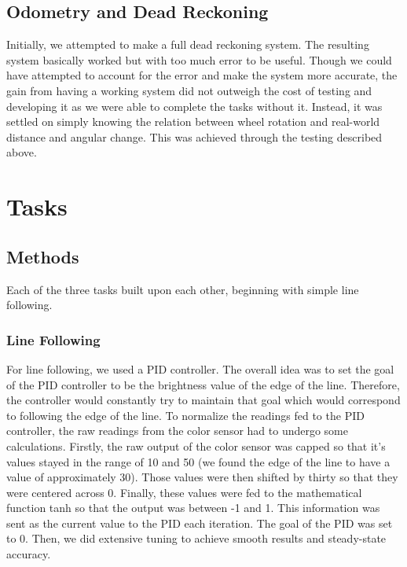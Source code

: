 \documentclass[12pt]{article}
\begin{document}
\subsection{Odometry and Dead Reckoning}

Initially, we attempted to make a full dead reckoning system. The resulting system basically worked but with too much error to be useful. Though we could have attempted to account for the error and make the system more accurate, the gain from having a working system did not outweigh the cost of testing and developing it as we were able to complete the tasks without it. Instead, it was settled on simply knowing the relation between wheel rotation and real-world distance and angular change. This was achieved through the testing described above. 

\section{Tasks}

\subsection{Methods}

Each of the three tasks built upon each other, beginning with simple line following.

\subsubsection{Line Following}

For line following, we used a PID controller. The overall idea was to set the goal of the PID controller to be the brightness value of the edge of the line. Therefore, the controller would constantly try to maintain that goal which would correspond to following the edge of the line. To normalize the readings fed to the PID controller, the raw readings from the color sensor had to undergo some calculations. Firstly, the raw output of the color sensor was capped so that it's values stayed in the range of 10 and 50 (we found the edge of the line to have a value of approximately 30). Those values were then shifted by thirty so that they were centered across 0. Finally, these values were fed to the mathematical function tanh so that the output was between -1 and 1. This information was sent as the current value to the PID each iteration. The goal of the PID was set to 0. Then, we did extensive tuning to achieve smooth results and steady-state accuracy.
\end{document}
